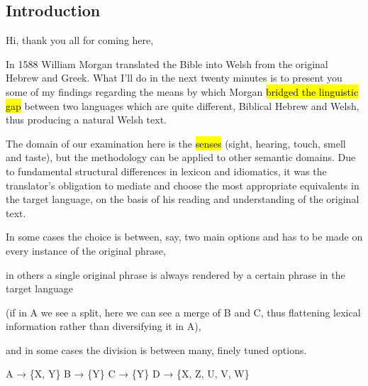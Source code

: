 \begin{paper}
	\setcounter{section}{-1}
	\section{Introduction}

	{\click} Hi, thank you all for coming here,

	{\click} In 1588 William Morgan translated the Bible into Welsh from the original Hebrew and Greek. What I’ll do in the next twenty minutes is to present you some of my findings regarding the means by which Morgan \hl{bridged the linguistic gap} between two languages which are quite different, Biblical Hebrew and Welsh, thus producing a natural Welsh text.

	The domain of our examination here is the \hl{senses} (sight, hearing, touch, smell and taste), but the methodology can be applied to other semantic domains. Due to fundamental structural differences in lexicon and idiomatics, it was the translator’s obligation to mediate and choose the most appropriate equivalents in the target language, on the basis of his reading and understanding of the original text.

	\begin{compactitem}
		\item {\click}  In some cases the choice is between, say, two main options and has to be made on every instance of the original phrase,
		\item {} in others a single original phrase is always rendered by a certain phrase in the target language
			\begin{compactitem}
				\item (if in A we see a split, here we can see a merge of B and C, thus flattening lexical information rather than diversifying it in A),
			\end{compactitem}
		\item and in  some cases the division is between many, finely tuned options.
	\end{compactitem}
\end{paper}

\begin{hopoint}
	A → \{X, Y\}\hfill
	B → \{Y\}\hfill
	C → \{Y\}\hfill
	D → \{X, Z, U, V, W\}
\end{hopoint}

